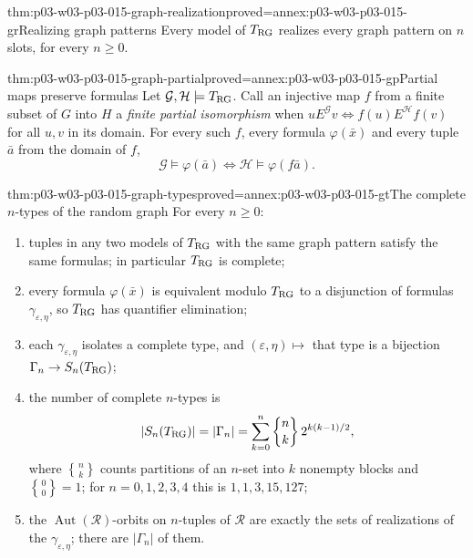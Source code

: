 \begin{hblemma}{thm:p03-w03-p03-015-graph-realization}{proved=annex:p03-w03-p03-015-gr}{Realizing graph patterns}
Every model of \(T_{\rm RG}\) realizes every graph pattern on \(n\)
slots, for every \(n\geq0\).
\end{hblemma}

\begin{hblemma}{thm:p03-w03-p03-015-graph-partial}{proved=annex:p03-w03-p03-015-gp}{Partial maps preserve formulas}
Let \(\mathcal G,\mathcal H\models T_{\rm RG}\). Call an injective map
\(f\) from a finite subset of \(G\) into \(H\) a \emph{finite partial
isomorphism} when \(uE^{\mathcal G}v\Leftrightarrow f(u)E^{\mathcal H}f(v)\)
for all \(u,v\) in its domain. For every such \(f\), every formula
\(\varphi(\bar x)\) and every tuple \(\bar a\) from the domain of \(f\),
\[
 \mathcal G\models\varphi(\bar a)\iff\mathcal H\models\varphi(f\bar a).
\]
\end{hblemma}

\begin{hbtheorem}{thm:p03-w03-p03-015-graph-types}{proved=annex:p03-w03-p03-015-gt}{The complete \(n\)-types of the random graph}
For every \(n\geq0\):
\begin{enumerate}
\item tuples in any two models of \(T_{\rm RG}\) with the same graph
      pattern satisfy the same formulas; in particular \(T_{\rm RG}\) is
      complete;
\item every formula \(\varphi(\bar x)\) is equivalent modulo
      \(T_{\rm RG}\) to a disjunction of formulas
      \(\gamma_{\varepsilon,\eta}\), so \(T_{\rm RG}\) has quantifier
      elimination;
\item each \(\gamma_{\varepsilon,\eta}\) isolates a complete type, and
      \((\varepsilon,\eta)\mapsto\) that type is a bijection
      \(\Gamma_n\to S_n(T_{\rm RG})\);
\item the number of complete \(n\)-types is
      \[
       |S_n(T_{\rm RG})|=|\Gamma_n|
        =\sum_{k=0}^{n}{n\brace k}\,2^{k(k-1)/2},
      \]
      where \({n\brace k}\) counts partitions of an \(n\)-set into \(k\)
      nonempty blocks and \({0\brace0}=1\); for \(n=0,1,2,3,4\) this is
      \(1,1,3,15,127\);
\item the \(\operatorname{Aut}(\mathcal R)\)-orbits on \(n\)-tuples of
      \(\mathcal R\) are exactly the sets of realizations of the
      \(\gamma_{\varepsilon,\eta}\); there are \(|\Gamma_n|\) of them.
\end{enumerate}
\end{hbtheorem}

